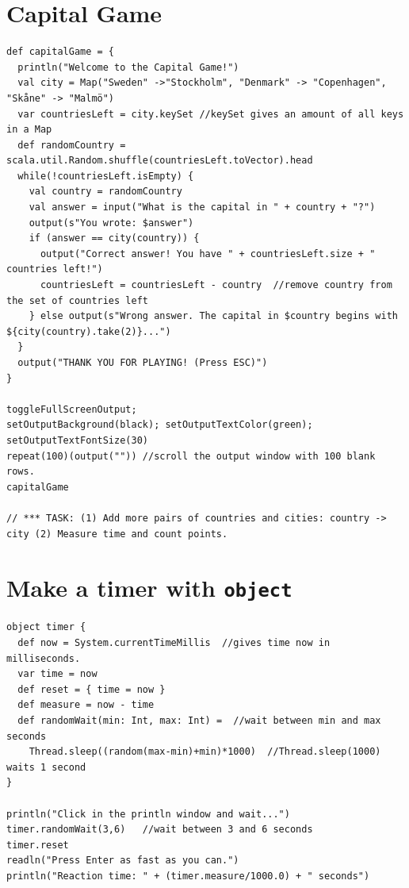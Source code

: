 \chapter{Capital Game}
\begin{lstlisting}[basicstyle={\ttfamily\fontsize{13}{16}\selectfont},numbers=none]
def capitalGame = {
  println("Welcome to the Capital Game!")
  val city = Map("Sweden" ->"Stockholm", "Denmark" -> "Copenhagen", "Skåne" -> "Malmö")
  var countriesLeft = city.keySet //keySet gives an amount of all keys in a Map 
  def randomCountry = scala.util.Random.shuffle(countriesLeft.toVector).head
  while(!countriesLeft.isEmpty) {
    val country = randomCountry
    val answer = input("What is the capital in " + country + "?")
    output(s"You wrote: $answer")
    if (answer == city(country)) {
      output("Correct answer! You have " + countriesLeft.size + " countries left!")
      countriesLeft = countriesLeft - country  //remove country from the set of countries left
    } else output(s"Wrong answer. The capital in $country begins with ${city(country).take(2)}...")
  }
  output("THANK YOU FOR PLAYING! (Press ESC)")
}

toggleFullScreenOutput;  
setOutputBackground(black); setOutputTextColor(green); setOutputTextFontSize(30)
repeat(100)(output("")) //scroll the output window with 100 blank rows.
capitalGame

// *** TASK: (1) Add more pairs of countries and cities: country -> city (2) Measure time and count points.
\end{lstlisting}
        
\chapter{Make a timer with \lstinline{object}}
\begin{lstlisting}[basicstyle={\ttfamily\fontsize{14}{17}\selectfont},numbers=none]
object timer {
  def now = System.currentTimeMillis  //gives time now in milliseconds.
  var time = now
  def reset = { time = now }
  def measure = now - time
  def randomWait(min: Int, max: Int) =  //wait between min and max seconds
    Thread.sleep((random(max-min)+min)*1000)  //Thread.sleep(1000) waits 1 second
}

println("Click in the println window and wait...")
timer.randomWait(3,6)   //wait between 3 and 6 seconds
timer.reset
readln("Press Enter as fast as you can.")
println("Reaction time: " + (timer.measure/1000.0) + " seconds")
\end{lstlisting}
        
